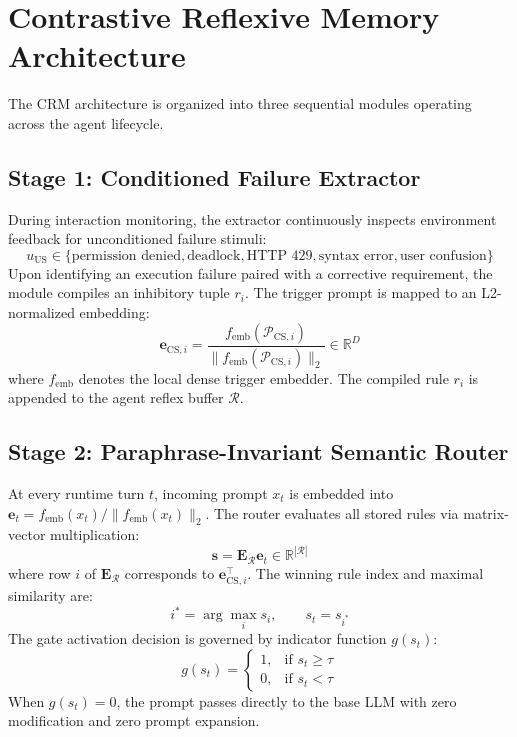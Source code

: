 \documentclass[10pt,conference]{IEEEtran}
\begin{document}
\section{Contrastive Reflexive Memory Architecture}

The CRM architecture is organized into three sequential modules operating across the agent lifecycle.

\subsection{Stage 1: Conditioned Failure Extractor}
During interaction monitoring, the extractor continuously inspects environment feedback for unconditioned failure stimuli:
\begin{equation}
    u_{\text{US}} \in \{\text{permission denied}, \text{deadlock}, \text{HTTP 429}, \text{syntax error}, \text{user confusion}\}
\end{equation}
Upon identifying an execution failure paired with a corrective requirement, the module compiles an inhibitory tuple $r_i$. The trigger prompt is mapped to an L2-normalized embedding:
\begin{equation}
    \mathbf{e}_{\text{CS}, i} = \frac{f_{\text{emb}}(\mathcal{P}_{\text{CS}, i})}{\|f_{\text{emb}}(\mathcal{P}_{\text{CS}, i})\|_2} \in \mathbb{R}^D
\end{equation}
where $f_{\text{emb}}$ denotes the local dense trigger embedder. The compiled rule $r_i$ is appended to the agent reflex buffer $\mathcal{R}$.

\subsection{Stage 2: Paraphrase-Invariant Semantic Router}
At every runtime turn $t$, incoming prompt $x_t$ is embedded into $\mathbf{e}_t = f_{\text{emb}}(x_t) / \|f_{\text{emb}}(x_t)\|_2$. The router evaluates all stored rules via matrix-vector multiplication:
\begin{equation}
    \mathbf{s} = \mathbf{E}_{\mathcal{R}} \mathbf{e}_t \in \mathbb{R}^{|\mathcal{R}|}
\end{equation}
where row $i$ of $\mathbf{E}_{\mathcal{R}}$ corresponds to $\mathbf{e}_{\text{CS}, i}^\top$. The winning rule index and maximal similarity are:
\begin{equation}
    i^* = \arg\max_{i} s_i, \qquad s_t = s_{i^*}
\end{equation}
The gate activation decision is governed by indicator function $g(s_t)$:
\begin{equation}
    g(s_t) = \begin{cases}
        1, & \text{if } s_t \ge \tau \\
        0, & \text{if } s_t < \tau
    \end{cases}
\end{equation}
When $g(s_t) = 0$, the prompt passes directly to the base LLM with zero modification and zero prompt expansion.
\end{document}
